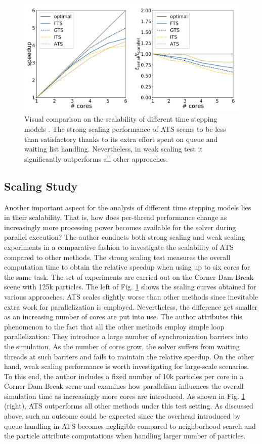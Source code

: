 \documentclass[
	11pt, 
	DIV10,
	ngerman,
	a4paper, 
	oneside, 
	headings=normal, 
	captions=tableheading,
	final, 
	numbers=noenddot
]{scrartcl}
\begin{document}
\begin{figure}[tb]
	\centering
	\includegraphics[scale=0.2]{images/8}
	\caption{\label{fig8} Visual comparison on the scalability of different time stepping models \cite{reinhardt2017fully}. The strong scaling performance of ATS seems to be less than satisfactory thanks to its extra effort spent on queue and waiting list handling. Nevertheless, in weak scaling test it significantly outperforms all other approaches.}
\end{figure}

\subsection{Scaling Study}
Another important aspect for the analysis of different time stepping models lies in their scalability. That is, how does per-thread performance change as increasingly more processing power becomes available for the solver during parallel execution? The author conducts both strong scaling and weak scaling experiments in a comparative fashion to investigate the scalability of ATS compared to other methods. The strong scaling test measures the overall computation time to obtain the relative speedup when using up to six cores for the same task. The set of experiments are carried out on the Corner-Dam-Break scene with 125k particles. The left of Fig. \ref{fig8} shows the scaling curves obtained for various approaches. ATS scales slightly worse than other methods since inevitable extra work for parallelization is employed. Nevertheless, the difference get smaller as an increasing number of cores are put into use. The author attributes this phenomenon to the fact that all the other methods employ simple loop parallelization: They introduce a large number of synchronization barriers into the simulation. As the number of cores grow, the solver suffers from waiting threads at such barriers and fails to maintain the relative speedup. On the other hand, weak scaling performance is worth investigating for large-scale scenarios. To this end, the author includes a fixed number of 10k particles per core in a Corner-Dam-Break scene and examines how parallelism influences the overall simulation time as increasingly more cores are introduced. As shown in Fig. \ref{fig8} (right), ATS outperforms all other methods under this test setting. As discussed above, such an outcome could be expected since the overhead introduced by queue handling in ATS becomes negligible compared to neighborhood search and the particle attribute computations when handling larger number of particles.
\end{document}
